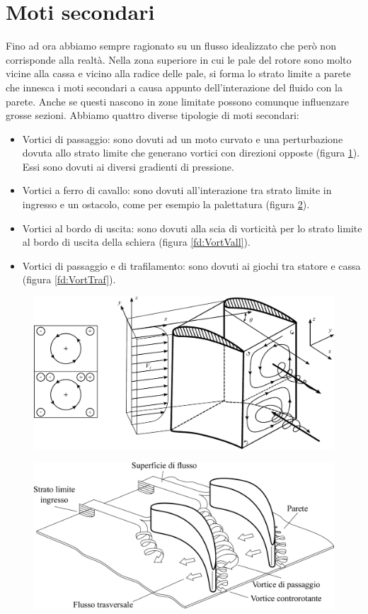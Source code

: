 \section{Moti secondari}
Fino ad ora abbiamo sempre ragionato su un flusso idealizzato che però non corrisponde alla realtà. Nella zona superiore in cui le pale del rotore sono molto vicine alla cassa e vicino alla radice delle pale, si forma lo strato limite a parete che innesca i moti secondari a causa appunto dell'interazione del fluido con la parete. Anche se questi nascono in zone limitate possono comunque influenzare grosse sezioni. Abbiamo quattro diverse tipologie di moti secondari:
\begin{itemize}
\item Vortici di passaggio: sono dovuti ad un moto curvato e una perturbazione dovuta allo strato limite che generano vortici con direzioni opposte (figura \ref{fig:VortPass}). Essi sono dovuti ai diversi gradienti di pressione.
\item Vortici a ferro di cavallo: sono dovuti all'interazione tra strato limite in ingresso e un ostacolo, come per esempio la palettatura (figura \ref{fd:VortFerrCav}).
\item Vortici al bordo di uscita: sono dovuti alla scia di vorticità per lo strato limite al bordo di uscita della schiera (figura \ref{fd:VortVall}).
\item Vortici di passaggio e di trafilamento: sono dovuti ai giochi tra statore e cassa (figura \ref{fd:VortTraf}).
\end{itemize}
\begin{figure}[h!]
\centering
  \includegraphics[width=.7\textwidth]{fig/VortPass.pdf}
\caption{}
\label{fig:VortPass}
\end{figure}
\begin{figure}[h!]
\centering
  \includegraphics[width=.7\textwidth]{fig/VortFerrCav.pdf}
\caption{}
\label{fd:VortFerrCav}
\end{figure}
